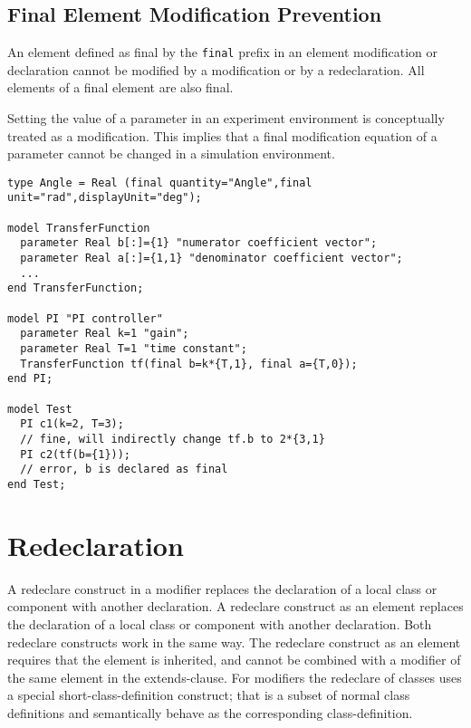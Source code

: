 \subsection{Final Element Modification Prevention}

An element defined as final by the \lstinline!final! prefix in an element
modification or declaration cannot be modified by a modification or by a
redeclaration. All elements of a final element are also final.

\begin{nonnormative}
Setting the value of a parameter in an experiment environment is conceptually treated as a modification.  This implies that a final modification equation
of a parameter cannot be changed in a simulation environment.
\end{nonnormative}

\begin{example}
\begin{lstlisting}[language=modelica]
type Angle = Real (final quantity="Angle",final unit="rad",displayUnit="deg");

model TransferFunction
  parameter Real b[:]={1} "numerator coefficient vector";
  parameter Real a[:]={1,1} "denominator coefficient vector";
  ...
end TransferFunction;

model PI "PI controller"
  parameter Real k=1 "gain";
  parameter Real T=1 "time constant";
  TransferFunction tf(final b=k*{T,1}, final a={T,0});
end PI;

model Test
  PI c1(k=2, T=3);
  // fine, will indirectly change tf.b to 2*{3,1}
  PI c2(tf(b={1}));
  // error, b is declared as final
end Test;
\end{lstlisting}
\end{example}

\section{Redeclaration}

A redeclare construct in a modifier replaces the declaration of a local
class or component with another declaration. A redeclare construct as an
element replaces the declaration of a local class or component with
another declaration. Both redeclare constructs work in the same way. The
redeclare construct as an element requires that the element is
inherited, and cannot be combined with a modifier of the same element in
the extends-clause. For modifiers the redeclare of classes uses a
special short-class-definition construct; that is a subset of normal
class definitions and semantically behave as the corresponding
class-definition.

